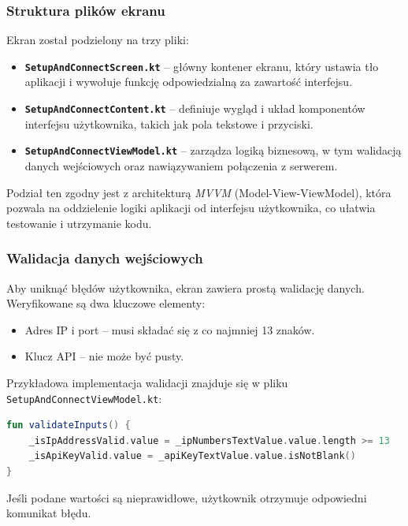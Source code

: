 \documentclass[12pt]{article}
\begin{document}
\subsubsection*{Struktura plików ekranu}
\noindent Ekran został podzielony na trzy pliki:
\begin{itemize}
    \item \textbf{\texttt{SetupAndConnectScreen.kt}} – główny kontener ekranu, który ustawia tło aplikacji i wywołuje funkcję odpowiedzialną za zawartość interfejsu.
    \item \textbf{\texttt{SetupAndConnectContent.kt}} – definiuje wygląd i układ komponentów interfejsu użytkownika, takich jak pola tekstowe i przyciski.
    \item \textbf{\texttt{SetupAndConnectViewModel.kt}} – zarządza logiką biznesową, w tym walidacją danych wejściowych oraz nawiązywaniem połączenia z serwerem.
\end{itemize}
Podział ten zgodny jest z architekturą \textit{MVVM} (Model-View-ViewModel), która pozwala na oddzielenie logiki aplikacji od interfejsu użytkownika, co ułatwia testowanie i utrzymanie kodu.

\subsubsection*{Walidacja danych wejściowych}
\noindent Aby uniknąć błędów użytkownika, ekran zawiera prostą walidację danych. Weryfikowane są dwa kluczowe elementy:
\begin{itemize}
    \item Adres IP i port – musi składać się z co najmniej 13 znaków.
    \item Klucz API – nie może być pusty.
\end{itemize}

\noindent Przykładowa implementacja walidacji znajduje się w pliku \\\texttt{SetupAndConnectViewModel.kt}:
\begin{lstlisting}[language=Kotlin]
fun validateInputs() {
    _isIpAddressValid.value = _ipNumbersTextValue.value.length >= 13
    _isApiKeyValid.value = _apiKeyTextValue.value.isNotBlank()
}
\end{lstlisting}

\noindent Jeśli podane wartości są nieprawidłowe, użytkownik otrzymuje odpowiedni komunikat błędu.
\end{document}
